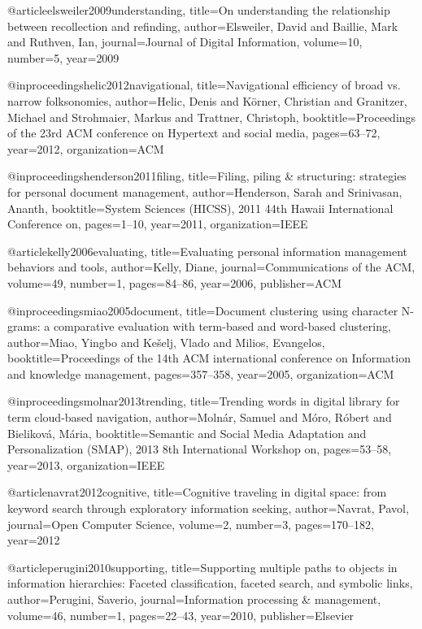 @article{elsweiler2009understanding,
  title={On understanding the relationship between recollection and refinding},
  author={Elsweiler, David and Baillie, Mark and Ruthven, Ian},
  journal={Journal of Digital Information},
  volume={10},
  number={5},
  year={2009}
}

@inproceedings{helic2012navigational,
  title={Navigational efficiency of broad vs. narrow folksonomies},
  author={Helic, Denis and K{\"o}rner, Christian and Granitzer, Michael and Strohmaier, Markus and Trattner, Christoph},
  booktitle={Proceedings of the 23rd ACM conference on Hypertext and social media},
  pages={63--72},
  year={2012},
  organization={ACM}
}

@inproceedings{henderson2011filing,
  title={Filing, piling \& structuring: strategies for personal document management},
  author={Henderson, Sarah and Srinivasan, Ananth},
  booktitle={System Sciences (HICSS), 2011 44th Hawaii International Conference on},
  pages={1--10},
  year={2011},
  organization={IEEE}
}

@article{kelly2006evaluating,
  title={Evaluating personal information management behaviors and tools},
  author={Kelly, Diane},
  journal={Communications of the ACM},
  volume={49},
  number={1},
  pages={84--86},
  year={2006},
  publisher={ACM}
}

@inproceedings{miao2005document,
  title={Document clustering using character N-grams: a comparative evaluation with term-based and word-based clustering},
  author={Miao, Yingbo and Ke{\v{s}}elj, Vlado and Milios, Evangelos},
  booktitle={Proceedings of the 14th ACM international conference on Information and knowledge management},
  pages={357--358},
  year={2005},
  organization={ACM}
}

@inproceedings{molnar2013trending,
  title={Trending words in digital library for term cloud-based navigation},
  author={Moln{\'a}r, Samuel and M{\'o}ro, R{\'o}bert and Bielikov{\'a}, M{\'a}ria},
  booktitle={Semantic and Social Media Adaptation and Personalization (SMAP), 2013 8th International Workshop on},
  pages={53--58},
  year={2013},
  organization={IEEE}
}

@article{navrat2012cognitive,
  title={Cognitive traveling in digital space: from keyword search through exploratory information seeking},
  author={Navrat, Pavol},
  journal={Open Computer Science},
  volume={2},
  number={3},
  pages={170--182},
  year={2012}
}


@article{perugini2010supporting,
  title={Supporting multiple paths to objects in information hierarchies: Faceted classification, faceted search, and symbolic links},
  author={Perugini, Saverio},
  journal={Information processing \& management},
  volume={46},
  number={1},
  pages={22--43},
  year={2010},
  publisher={Elsevier}
}

